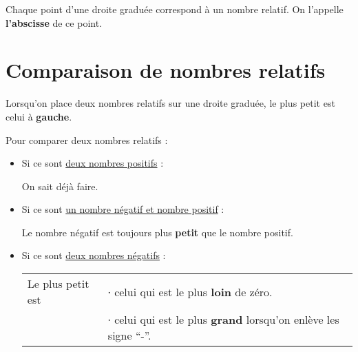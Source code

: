 \documentclass[../€Cours-complet/Cours-complet]{subfiles}
\begin{document}
\newpage

\begin{cours}[Abscisse]
	Chaque point d'une droite graduée correspond à un nombre relatif. On l'appelle \textbf{l'abscisse} de ce point.
\end{cours}

\section{Comparaison de nombres relatifs}

\begin{cours}
	Lorsqu'on place deux nombres relatifs sur une droite graduée, le plus petit est celui à \textbf{gauche}.
\end{cours}

\begin{exemple}
	 \hspace{2em}
\end{exemple}

\begin{methode}
	Pour comparer deux nombres relatifs :
	\begin{itemize}
		\item Si ce sont \uline{deux nombres positifs} :

		      On sait déjà faire.
		\item Si ce sont \uline{un nombre négatif et nombre positif} :

		      Le nombre négatif est toujours plus \textbf{petit} que le nombre positif.
		\item Si ce sont \uline{deux nombres négatifs} :

		      \begin{tabular}{ll}
			      Le plus petit est & ∙ celui qui est le plus \textbf{loin} de zéro.                         \\
			                        & ∙ celui qui est le plus \textbf{grand} lorsqu'on enlève les signe “-”.
		      \end{tabular}
	\end{itemize}
\end{methode}
\end{document}
